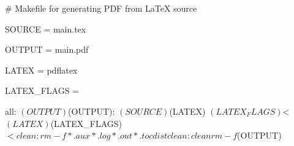 # Makefile for generating PDF from LaTeX source

SOURCE = main.tex

OUTPUT = main.pdf

LATEX = pdflatex

LATEX_FLAGS = 

all: $(OUTPUT)

$(OUTPUT): $(SOURCE)
	$(LATEX) $(LATEX_FLAGS) $<
	$(LATEX) $(LATEX_FLAGS) $<

clean:
	rm -f *.aux *.log *.out *.toc

distclean: clean
	rm -f $(OUTPUT)
